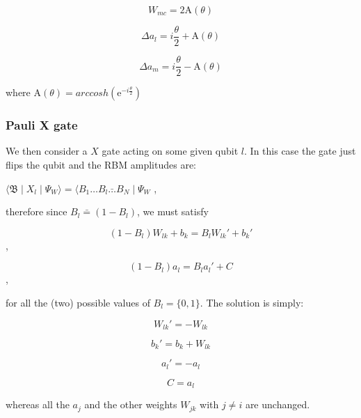 \begin{equation}
   W_{mc} = 2\mathrm{A}(\theta) 
\end{equation}

\begin{equation}
   \Delta a_{l} = i \frac{\theta}{2} + \mathrm{A}(\theta)
\end{equation}

\begin{equation}
   \Delta a_{m} = i \frac{\theta}{2} - \mathrm{A}(\theta)
\end{equation}

where $\mathrm{A}(\theta) = arccosh(\mathrm{e}^{-i \frac{\theta}{2}})$

\subsubsection{Pauli X gate}
We then consider a $X$ gate acting on some given qubit $l$. In this case the gate just flips the qubit
and the RBM amplitudes are:

$
    \langle \mathfrak{B} \mid X_{l} \mid \Psi_{W}  \rangle = 
    \langle B_{1} \dots B_{l}\bar \dots B_{N} \mid \Psi_{W}
$
,

therefore since $B_{l}\bar = (1-B_{l})$, we must satisfy 

\begin{equation}
    (1-B_{l})W_{lk} + b_{k} = B_{l} W_{lk}\prime + b_{k}\prime
\end{equation},

\begin{equation}
   (1-B_{l}) a_{l} = B_{l} a_{l}\prime + C 
\end{equation},

for all the (two) possible values of $B_{l} = \{0,1\}$. The solution is simply:

\begin{equation}
   W_{lk}\prime = -W_{lk}
\end{equation}

\begin{equation}
   b_{k}\prime = b_{k} + W_{lk}
\end{equation}

\begin{equation}
   a_{l}\prime = -a_{l}
\end{equation}

\begin{equation}
   C = a_{l}
\end{equation}

whereas all the $a_{j}$ and the other weights $W_{jk}$ with $j \neq i$ are unchanged.


